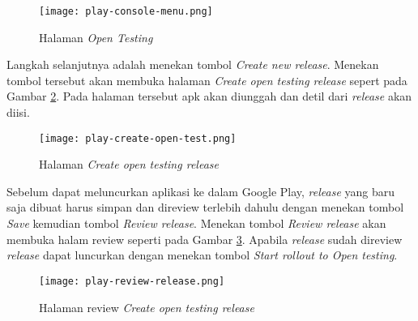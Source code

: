 \begin{figure}[H] 
	\centering  
	\texttt{[image: play-console-menu.png]}  
	\caption[Halaman \textit{Open Testing}] {Halaman \textit{Open Testing}} 
	\label{fig:play:open:test} 
\end{figure} 

Langkah selanjutnya adalah menekan tombol \textit{Create new release}. Menekan tombol tersebut akan membuka halaman \textit{Create open testing release} sepert pada Gambar \ref{fig:play:open:test:create}. Pada halaman tersebut apk akan diunggah dan detil dari \textit{release} akan diisi.  

\begin{figure}[H] 
	\centering  
	\texttt{[image: play-create-open-test.png]}  
	\caption[Halaman \textit{Create open testing release}] {Halaman \textit{Create open testing release}} 
	\label{fig:play:open:test:create} 
\end{figure} 

Sebelum dapat meluncurkan aplikasi ke dalam Google Play, \textit{release} yang baru saja dibuat harus simpan dan direview terlebih dahulu dengan menekan tombol \textit{Save} kemudian tombol \textit{Review release}. Menekan tombol \textit{Review release} akan membuka halam review seperti pada Gambar \ref{fig:play:open:test:review}. Apabila \textit{release} sudah direview \textit{release} dapat luncurkan dengan menekan tombol \textit{Start rollout to Open testing}.

\begin{figure}[H] 
	\centering  
	\texttt{[image: play-review-release.png]}  
	\caption[Halaman review \textit{Create open testing release}] {Halaman review \textit{Create open testing release}} 
	\label{fig:play:open:test:review} 
\end{figure} 